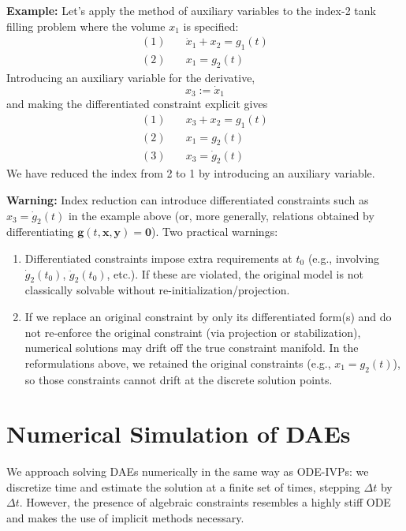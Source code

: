 \begin{exampleBox}
\textbf{Example:} Let's apply the method of auxiliary variables to the index-2 tank filling problem where the volume $x_1$ is specified:
\begin{align}
    (1)\quad & \dot{x}_1 + x_2 = g_1(t) \\
    (2)\quad & x_1 = g_2(t)
\end{align}
Introducing an auxiliary variable for the derivative,
\begin{equation}
x_3 := \dot x_1
\end{equation}
and making the differentiated constraint explicit gives
\begin{align}
    (1)\quad & x_3 + x_2 = g_1(t) \\
    (2)\quad & x_1 = g_2(t) \\
    (3)\quad & x_3 = \dot g_2(t)
\end{align}
We have reduced the index from 2 to 1 by introducing an auxiliary variable.
\end{exampleBox}

\begin{warningBox}
\textbf{Warning:} Index reduction can introduce differentiated constraints such as $x_3=\dot g_2(t)$ in the example above (or, more generally, relations obtained by differentiating $\mathbf g(t,\mathbf x,\mathbf y)=\mathbf 0$). Two practical warnings:
\begin{enumerate}
\item Differentiated constraints impose extra requirements at $t_0$ (e.g., involving $\dot g_2(t_0)$, $\ddot g_2(t_0)$, etc.). If these are violated, the original model is not classically solvable without re-initialization/projection. 
\item If we replace an original constraint by only its differentiated form(s) and do not re-enforce the original constraint (via projection or stabilization), numerical solutions may drift off the true constraint manifold. In the reformulations above, we retained the original constraints (e.g., $x_1=g_2(t)$), so those constraints cannot drift at the discrete solution points.
\end{enumerate}
\end{warningBox}

\section{Numerical Simulation of DAEs}

We approach solving DAEs numerically in the same way as ODE-IVPs: we discretize time and estimate the solution at a finite set of times, stepping $\Delta t$ by $\Delta t$. However, the presence of algebraic constraints resembles a highly stiff ODE and makes the use of implicit methods necessary.

